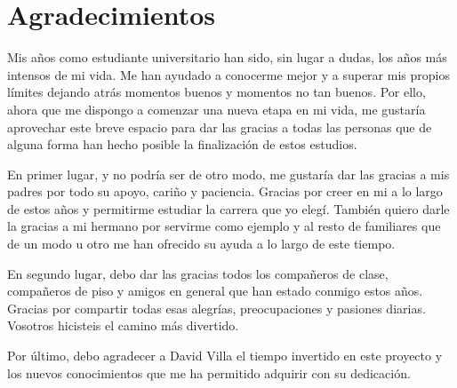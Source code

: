 \chapter{Agradecimientos}

Mis años como estudiante universitario han sido, sin lugar a dudas, los años más intensos de mi
vida. Me han ayudado a conocerme mejor y a superar mis propios límites dejando atrás momentos buenos
y momentos no tan buenos. Por ello, ahora que me dispongo a comenzar una nueva etapa en mi vida, me
gustaría aprovechar este breve espacio para dar las gracias a todas las personas que de alguna forma
han hecho posible la finalización de estos estudios.

En primer lugar, y no podría ser de otro modo, me gustaría dar las gracias a mis padres por todo su
apoyo, cariño y paciencia. Gracias por creer en mi a lo largo de estos años y permitirme estudiar la
carrera que yo elegí. También quiero darle la gracias a mi hermano por servirme como ejemplo y al
resto de familiares que de un modo u otro me han ofrecido su ayuda a lo largo de este tiempo.

En segundo lugar, debo dar las gracias todos los compañeros de clase, compañeros de piso y amigos en
general que han estado conmigo estos años. Gracias por compartir todas esas alegrías, preocupaciones
y pasiones diarias. Vosotros hicisteis el camino más divertido.

Por último, debo agradecer a David Villa el tiempo invertido en este proyecto y los nuevos
conocimientos que me ha permitido adquirir con su dedicación.


